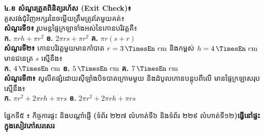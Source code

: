\documentclass[a4paper,10pt]{article}
\newcommand{\en}[1]{{\TimesEn #1}}
\newcommand{\enbf}[1]{{\TimesEn\textbf{#1}}}
\newcommand{\unit}[1]{\,\text{\en{#1}}}
\newcommand{\secbar}[2]{%
  \vspace{3pt}%
  \begin{tcolorbox}[
    enhanced, sharp corners, colback=headgray, colframe=black,
    boxrule=0.9pt, boxsep=1pt, top=2.5pt, bottom=2.5pt, left=6pt, right=6pt,
    after skip=3pt
  ]
    {\muol\fontsize{9.2pt}{13.5pt}\selectfont #1}\hfill{\fontsize{8.3pt}{11.5pt}\selectfont\textbf{#2}}
  \end{tcolorbox}%
}
\begin{document}
\hfill
\begin{minipage}[t]{8.5cm}\vspace{0pt}
  \begin{tcolorbox}[
    enhanced, sharp corners, colback=white, colframe=black, equal height group=rowE5,
    boxrule=0.85pt, boxsep=3pt, top=6pt, bottom=6pt, left=5.5pt, right=5.5pt
  ]\raggedright
    \textbf{៤.ខ សំណួរត្រួតពិនិត្យរហ័ស (\en{Exit Check})៖}\\
    គូសវង់ជុំវិញអក្សរនៃចម្លើយត្រឹមត្រូវតែមួយគត់៖\\[6.5pt]
    \textbf{សំណួរទី១៖} រូបមន្តផ្ទៃក្រឡាទាំងអស់នៃកោនបរិវត្តគឺ៖\\[2.5pt]
    \hspace*{0.10cm}\textbf{ក.} $\pi r h + \pi r^2$ \hspace{0.25cm} \textbf{ខ.} $2\pi r s + \pi r^2$ \hspace{0.25cm} \textbf{គ.} $\pi r(s + r)$\\[7.5pt]
    \textbf{សំណួរទី២៖} កោនបរិវត្តមួយមានកាំបាត $r = 3\unit{cm}$ និងកម្ពស់ $h = 4\unit{cm}$ មានជនេត្រ $s$ ស្មើនឹង៖\\[2.5pt]
    \hspace*{0.15cm}\textbf{ក.} $4\unit{cm}$ \hspace{0.65cm} \textbf{ខ.} $5\unit{cm}$ \hspace{0.65cm} \textbf{គ.} $7\unit{cm}$\\[7.5pt]
    \textbf{សំណួរទី៣៖} សូលីតផ្សំដោយស៊ីឡាំងបិទបាតក្រោមមួយ និងដំបូលកោនបន្តុបពីលើ មានផ្ទៃក្រឡាសរុបស្មើនឹង៖\\[2.5pt]
    \hspace*{0.10cm}\textbf{ក.} $\pi r^2 + 2\pi rh + \pi rs$ \hspace{0.25cm} \textbf{ខ.} $2\pi r^2 + 2\pi rh + \pi rs$
  \end{tcolorbox}
\end{minipage}

\vspace{11pt}
\secbar{ផ្នែកទី៥ ៖ កិច្ចការផ្ទះ និងបណ្ដាំផ្ញើ \enbf{(}ទំព័រ ២២៧ លំហាត់ទី៦ និងទំព័រ ២២៩ លំហាត់ទី១២\enbf{)}}{ធ្វើនៅផ្ទះក្នុងសៀវភៅសរសេរ}
\end{document}
